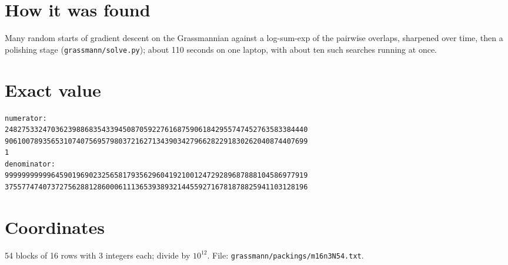 \documentclass[11pt,a4paper]{article}
\begin{document}
\section{How it was found}
Many random starts of gradient descent on the Grassmannian against a log-sum-exp of the pairwise overlaps, sharpened over time, then a polishing stage (\texttt{grassmann/solve.py}); about 110 seconds on one laptop, with about ten such searches running at once.


\appendix
\section{Exact value}
{\small
\begin{verbatim}
numerator:
248275332470362398868354339450870592276168759061842955747452763583384440
906100789356531074075695798037216271343903427966282291830262040874407699
1
denominator:
999999999996459019690232565817935629604192100124729289687888104586977919
375577474073727562881286000611136539389321445592716781878825941103128196
\end{verbatim}}

\section{Coordinates}
54 blocks of 16 rows with 3 integers each; divide by $10^{12}$. File: \texttt{grassmann/packings/m16n3N54.txt}.
{\tiny
\begin{multicols}{3}
\end{multicols}}
\end{document}
